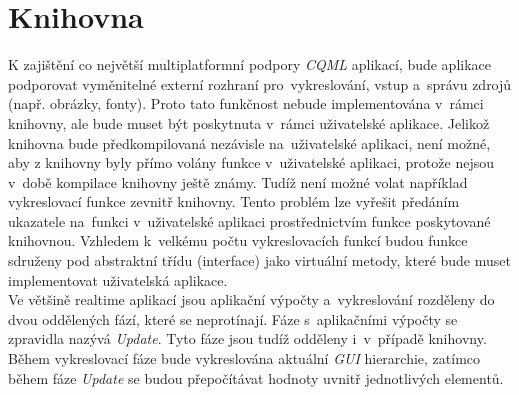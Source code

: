 \documentclass[11pt,twoside,a4paper]{book}
\begin{document}
\section{\label{SEC:libI}Knihovna}
K zajištění co největší multiplatformní podpory \textit{CQML} aplikací, bude aplikace podporovat vyměnitelné externí rozhraní pro~vykreslování, vstup a~správu zdrojů (např. obrázky, fonty). Proto tato funkčnost nebude implementována v~rámci knihovny, ale bude muset být poskytnuta v~rámci uživatelské aplikace. 
Jelikož knihovna bude předkompilovaná nezávisle na~uživatelské aplikaci, není možné, aby z knihovny byly přímo volány funkce v~uživatelské aplikaci, protože nejsou v~době kompilace knihovny ještě známy. Tudíž není možné volat například vykreslovací funkce zevnitř knihovny. Tento problém lze vyřešit předáním ukazatele na~funkci v~uživatelské aplikaci prostřednictvím funkce poskytované knihovnou. Vzhledem k~velkému počtu vykreslovacích funkcí budou funkce sdruženy pod abstraktní třídu (interface) jako virtuální metody, které bude muset implementovat uživatelská aplikace.\\

Ve většině realtime aplikací jsou aplikační výpočty a~vykreslování rozděleny do dvou oddělených fází, které se neprotínají. Fáze s~aplikačními výpočty se zpravidla nazývá \textit{Update}. Tyto fáze jsou tudíž odděleny i~v~případě knihovny. Během vykreslovací fáze bude vykreslována aktuální \textit{GUI} hierarchie, zatímco během fáze \textit{Update} se budou přepočítávat hodnoty uvnitř jednotlivých elementů.\\
\end{document}
